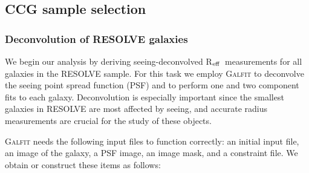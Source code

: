 \documentclass[iop,apj]{emulateapj}
\newcommand{\Reff}{R$_{\rm eff}$}
\begin{document}
\subsection{CCG sample selection}

\subsubsection{Deconvolution of RESOLVE galaxies}
\label{deconv}

\noindent We begin our analysis by deriving seeing-deconvolved \Reff\ measurements for all galaxies in the RESOLVE sample. For this task we employ \textsc{Galfit} \citep{Peng2002} to deconvolve the seeing point spread function (PSF) and to perform one and two component fits to each galaxy. Deconvolution is especially important since the smallest galaxies in RESOLVE are most affected by seeing, and accurate radius measurements are crucial for the study of these objects. 

\textsc{Galfit} needs the following input files to function correctly: an initial input file, an image of the galaxy, a PSF image, an image mask, and a constraint file. We obtain or construct these items as follows:
\end{document}
